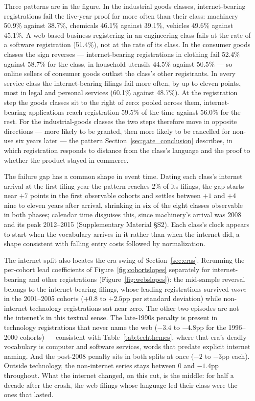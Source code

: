 Three patterns are in the figure. In the industrial goods classes,
internet-bearing registrations fail the five-year proof far more often
than their class: machinery 50.9\% against 38.7\%, chemicals 46.1\%
against 39.1\%, vehicles 49.6\% against 45.1\%. A web-based business
registering in an engineering class fails at the rate of a software
registration (51.4\%), not at the rate of its class. In the consumer
goods classes the sign reverses --- internet-bearing registrations in
clothing fail 52.4\% against 58.7\% for the class, in household utensils
44.5\% against 50.5\% --- so online sellers of consumer goods outlast the
class's other registrants. In every service class the internet-bearing
filings fail more often, by up to eleven points, most in legal and
personal services (60.1\% against 48.7\%). At the registration step the
goods classes sit to the right of zero: pooled across them,
internet-bearing applications reach registration 59.5\% of the time
against 56.0\% for the rest. For the industrial-goods classes the two
steps therefore move in opposite directions --- more likely to be
granted, then more likely to be cancelled for non-use six years later
--- the pattern Section~\ref{sec:gate_conclusion} describes, in which
registration responds to distance from the class's language and the
proof to whether the product stayed in commerce.

The failure gap has a common shape in event time. Dating each class's
internet arrival at the first filing year the pattern reaches 2\% of its
filings, the gap starts near $+7$ points in the first observable cohorts
and settles between $+1$ and $+4$ nine to eleven years after arrival,
shrinking in six of the eight classes observable in both phases; calendar
time disguises this, since machinery's arrival was 2008 and its peak
2012--2015 (Supplementary Material \S S2). Each class's clock appears to
start when the vocabulary arrives in it rather than when the internet
did, a shape consistent with falling entry costs followed by
normalization.

The internet split also locates the era swing of
Section~\ref{sec:eras}. Rerunning the per-cohort lead coefficients of
Figure~\ref{fig:cohortslopes} separately for internet-bearing and other
registrations (Figure~\ref{fig:webslopes}): the mid-sample reversal
belongs to the internet-bearing filings, whose leading registrations
survived \emph{more} in the 2001--2005 cohorts ($+0.8$ to $+2.5$pp per
standard deviation) while non-internet technology registrations sat near
zero. The other two episodes are not the internet's in this textual
sense. The late-1990s penalty is present in technology registrations that
never name the web ($-3.4$ to $-4.8$pp for the 1996--2000 cohorts) ---
consistent with Table~\ref{tab:techthemes}, where that era's deadly
vocabulary is computer and software services, words that predate explicit
internet naming. And the post-2008 penalty sits in both splits at once
($-2$ to $-3$pp each). Outside technology, the non-internet series stays
between $0$ and $-1.4$pp throughout. What the internet changed, on
this cut, is the middle: for half a decade after the crash, the web
filings whose language led their class were the ones that lasted.

